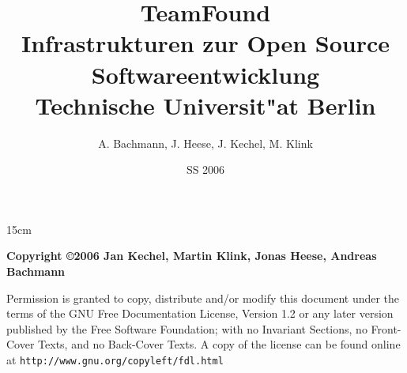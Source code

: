 \documentclass[12pt,a4paper]{report}
\begin{document}
{}
%
\title{TeamFound\\Infrastrukturen zur Open Source Softwareentwicklung\\Technische Universit"at Berlin}
\author{A. Bachmann, J. Heese, J. Kechel, M. Klink}
\date{SS 2006}
%
\maketitle
%
\begin{parbox}[b][17cm][s]{15cm}

\textbf{Copyright \copyright 2006 Jan Kechel, Martin Klink, Jonas Heese, Andreas Bachmann}

Permission is granted to copy, distribute and/or modify this document
under the terms of the GNU Free Documentation License, Version 1.2
or any later version published by the Free Software Foundation;
with no Invariant Sections, no Front-Cover Texts, and no Back-Cover
Texts.  A copy of the license can be found online at \texttt{http://www.gnu.org/copyleft/fdl.html}
\end{parbox}

%
\tableofcontents
\cleardoublepage
%
%
%



%
%
%
%
\end{document}
